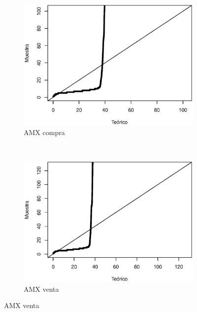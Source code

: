 \documentclass[11pt]{article}
\numberwithin{equation}{section} %
\begin{document}
\clearpage

\begin{figure}[htbp]
\centering
\begin{subfigure}[b]{0.5\textwidth}
\centering
\includegraphics[width=\textwidth, trim=0 0.5cm 0 1cm]{amxcompraqq.eps}
\caption{AMX compra}
\label{fig:amxcompraqq}
\end{subfigure}%
~ %
\begin{subfigure}[b]{0.5\textwidth}
\centering
\includegraphics[width=\textwidth, trim=0 0.5cm 0 1cm]{amxventaqq.eps}
\caption{AMX venta}
\label{fig:amxventaqq}
\end{subfigure}


\end{figure}
\end{document}
